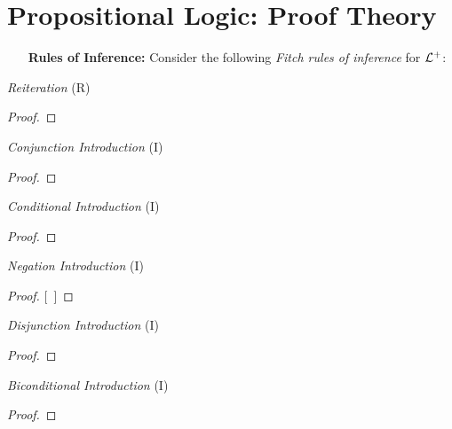 \documentclass[a4paper, 11pt]{article} %
\begin{document}
\section*{\sc Propositional Logic: Proof Theory}

\begin{enumerate}[leftmargin=1.2in,labelsep=.15in] %
  \item[\bf Rules of Inference:] Consider the following \textit{Fitch rules of inference} for $\mathcal{L}^+$:
\end{enumerate}

\begin{multicols}{2}\footnotesize

  \textit{Reiteration} (R)
  \begin{proof}
     
  \end{proof}
  \medskip

  \textit{Conjunction Introduction} (\eand I)
  \begin{proof}
     
     
  \end{proof}
  \medskip

  \textit{Conditional Introduction} (\eif I)
  \begin{proof}
    \open
    \close
  \end{proof}
  \medskip

  \textit{Negation Introduction} (\enot I)
  \begin{proof}
  \open
    \metaA {}   %
    \metaB
  \close
  [\ ]{\enot\metaA}
  \end{proof}
  \medskip

  \textit{Disjunction Introduction} (\eor I)
  \begin{proof}
  \end{proof}
  \medskip

  \textit{Biconditional Introduction} (\eiff I)
  \begin{proof}
    \open
       
    \close
    \open
       
    \close
  \end{proof}
  \medskip


\end{multicols}
\end{document}
